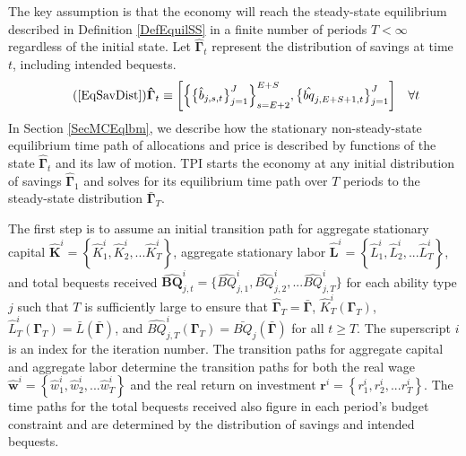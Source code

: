 \documentclass[letterpaper,12pt]{article}
\theoremstyle{definition}
\begin{document}
  The key assumption is that the economy will reach the steady-state equilibrium described in Definition \ref{DefEquilSS} in a finite number of periods $T<\infty$ regardless of the initial state. Let $\bm{\hat{\Gamma}}_t$ represent the distribution of savings at time $t$, including intended bequests.
  \begin{equation}\tag{\ref{EqSavDist}}
    \bm{\hat{\Gamma}}_t \equiv \biggl[\Bigl\{\bigl\{\hat{b}_{j,s,t}\bigr\}_{j=1}^J\Bigr\}_{s=E+2}^{E+S},\bigl\{\hat{bq}_{j,E+S+1,t}\bigr\}_{j=1}^J\biggr] \quad\forall t
  \end{equation}
  In Section \ref{SecMCEqlbm}, we describe how the stationary non-steady-state equilibrium time path of allocations and price is described by functions of the state $\bm{\hat{\Gamma}}_t$ and its law of motion. TPI starts the economy at any initial distribution of savings $\bm{\hat{\Gamma}}_1$ and solves for its equilibrium time path over $T$ periods to the steady-state distribution $\bm{\bar{\Gamma}}_T$.

  The first step is to assume an initial transition path for aggregate stationary capital $\bm{\hat{K}}^i = \left\{\hat{K}_1^i,\hat{K}_2^i,...\hat{K}_T^i\right\}$, aggregate stationary labor $\bm{\hat{L}}^i = \left\{\hat{L}_1^i,\hat{L}_2^i,...\hat{L}_T^i\right\}$, and total bequests received $\bm{\hat{BQ}}_{j,t}^i=\{\hat{BQ}_{j,1}^i,\hat{BQ}_{j,2}^i,...\hat{BQ}_{j,T}^i\}$ for each ability type $j$ such that $T$ is sufficiently large to ensure that $\bm{\hat{\Gamma}}_T = \bar{\bm{\Gamma}}$, $\hat{K}_T^i\left(\bm{\Gamma}_T\right)$, $\hat{L}_T^i\left(\bm{\Gamma}_T\right) = \bar{L}\left(\bar{\bm{\Gamma}}\right)$, and $\hat{BQ}_{j,T}^i\left(\bm{\Gamma}_T\right) = \bar{BQ}_j\left(\bar{\bm{\Gamma}}\right)$ for all $t\geq T$. The superscript $i$ is an index for the iteration number. The transition paths for aggregate capital and aggregate labor determine the transition paths for both the real wage $\bm{\hat{w}}^i = \left\{\hat{w}_1^i,\hat{w}_2^i,...\hat{w}_T^i\right\}$ and the real return on investment $\bm{r}^i = \left\{r_1^i,r_2^i,...r_T^i\right\}$. The time paths for the total bequests received also figure in each period's budget constraint and are determined by the distribution of savings and intended bequests.
\end{document}
